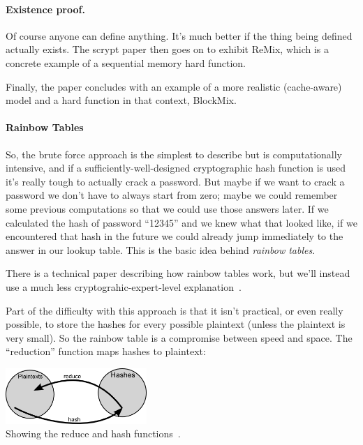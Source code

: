 \documentclass[a4paper]{report}
\begin{document}
\paragraph{Existence proof.} Of course anyone can define anything.
It's much better if the thing being defined actually exists. The
scrypt paper then goes on to exhibit ReMix, which is a concrete
example of a sequential memory hard function.

Finally, the paper concludes with an example of a more realistic
(cache-aware) model and a hard function in that context, BlockMix.

\paragraph{Rainbow Tables} So, the brute force approach is the simplest to describe but is computationally intensive, and if a sufficiently-well-designed cryptographic hash function is used it's really tough to actually crack a password. But maybe if we want to crack a password we don't have to always start from zero; maybe we could remember some previous computations so that we could use those answers later. If we calculated the hash of password ``12345'' and we knew what that looked like, if we encountered that hash in the future we could already jump immediately to the answer in our lookup table. This is the basic idea behind \textit{rainbow tables}.

There is a technical paper describing how rainbow tables work, but we'll instead use a much less cryptograhic-expert-level explanation~\cite{rainbowtables}. 

Part of the difficulty with this approach is that it isn't practical, or even really possible, to store the hashes for every possible plaintext (unless the plaintext is very small). So the rainbow table is a compromise between speed and space. The ``reduction'' function maps hashes to plaintext:

\begin{center}
	\includegraphics[width=0.4\textwidth]{images/rainbow-tables-reduce.png}\\
	Showing the reduce and hash functions~\cite{rainbowtables}.
\end{center}
\end{document}
